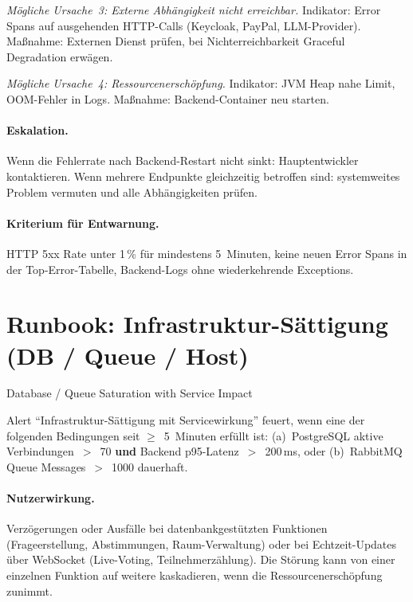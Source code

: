\emph{Mögliche Ursache~3: Externe Abhängigkeit nicht erreichbar.} Indikator: Error Spans auf ausgehenden HTTP-Calls (Keycloak, PayPal, LLM-Provider). Maßnahme: Externen Dienst prüfen, bei Nichterreichbarkeit Graceful Degradation erwägen.

\emph{Mögliche Ursache~4: Ressourcenerschöpfung.} Indikator: JVM Heap nahe Limit, OOM-Fehler in Logs. Maßnahme: Backend-Container neu starten.

\paragraph{Eskalation.}
Wenn die Fehlerrate nach Backend-Restart nicht sinkt: Hauptentwickler kontaktieren. Wenn mehrere Endpunkte gleichzeitig betroffen sind: systemweites Problem vermuten und alle Abhängigkeiten prüfen.

\paragraph{Kriterium für Entwarnung.}
HTTP 5xx Rate unter 1\,\% für mindestens 5~Minuten, keine neuen Error Spans in der Top-Error-Tabelle, Backend-Logs ohne wiederkehrende Exceptions.
\clearpage

\section{Runbook: Infrastruktur-Sättigung (DB / Queue / Host)}
\label{app:runbook-saettigung}

\begin{description}[style=nextline, leftmargin=3.5cm]
  \item[Incident-Typ] Database / Queue Saturation with Service Impact
  \item[Trigger] Alert \enquote{Infrastruktur-Sättigung mit Servicewirkung} feuert, wenn eine der folgenden Bedingungen seit $\geq$~5~Minuten erfüllt ist: (a)~PostgreSQL aktive Verbindungen~$>$~70 \textbf{und} Backend p95-Latenz~$>$~200\,ms, oder (b)~RabbitMQ Queue Messages~$>$~1000 dauerhaft.
\end{description}

\paragraph{Nutzerwirkung.}
Verzögerungen oder Ausfälle bei datenbankgestützten Funktionen (Frageerstellung, Abstimmungen, Raum-Verwaltung) oder bei Echtzeit-Updates über WebSocket (Live-Voting, Teilnehmerzählung). Die Störung kann von einer einzelnen Funktion auf weitere kaskadieren, wenn die Ressourcenerschöpfung zunimmt.

